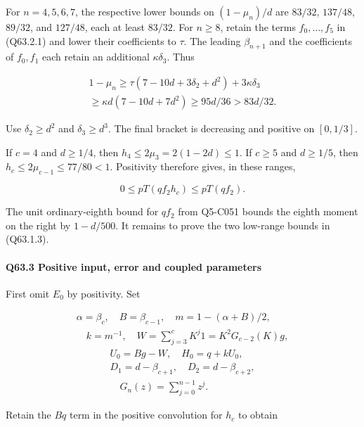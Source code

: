 For $n=\allowbreak 4,\allowbreak  5,\allowbreak  6,\allowbreak  7$, the respective lower bounds on $(1-\mu_n)/d$ are
$83/32$, $137/48$, $89/32$, and $127/48$, each at least $83/32$.
For $n\ge\allowbreak 8$, retain the terms $f_0,\allowbreak  \ldots,\allowbreak  f_5$ in (Q63.2.1) and lower their coefficients to $\tau$.
The leading $\beta_{n+1}$ and the coefficients of $f_0,\allowbreak  f_1$ each retain an additional $\kappa \delta_3$. Thus

\[
\begin{gathered}
1-\mu_n\ge\tau(7-10d+3\delta_2+d^2)+3\kappa \delta_3\\
\ge\kappa d(7-10d+7d^2)\ge95d/36>83d/32.
\end{gathered}
\]

Use $\delta_2\ge\allowbreak  d^2$ and $\delta_3\ge\allowbreak  d^3$. The final bracket is decreasing and positive on $[0,\allowbreak  1/3]$.

If $c=\allowbreak 4$ and $d\ge\allowbreak 1/4$, then $h_4\le\allowbreak 2\mu_3=\allowbreak 2(1-2d)\le\allowbreak 1$.
If $c\ge\allowbreak 5$ and $d\ge\allowbreak 1/5$, then $h_c\le\allowbreak 2\mu_{c-1}\le\allowbreak 77/80<\allowbreak 1$.
Positivity therefore gives, in these ranges,

\[
0\le pT(qf_2h_c)\le pT(qf_2).
\tag{Q63.2.3}\label{eq:Q63:Q63:2:3}
\]

The unit ordinary-eighth bound for $qf_2$ from Q5-C051 bounds the eighth moment on the right by $1-d/500$.
It remains to prove the two low-range bounds in (Q63.1.3).

\paragraph{Q63.3 Positive input, error and coupled parameters}

First omit $E_0$ by positivity. Set

\[
\begin{gathered}
\alpha=\beta_c,\quad B=\beta_{c-1},\quad m=1-(\alpha+B)/2,\\
\quad k=m^{-1},\quad W=\sum_{j=3}^cK^j1=K^2G_{c-2}(K)g,
\end{gathered}
\]
\[
\begin{gathered}
U_0=Bg-W,\quad H_0=q+kU_0,\quad\\
D_1=d-\beta_{c+1},\quad D_2=d-\beta_{c+2},\\
\quad G_n(z)=\sum_{j=0}^{n-1}z^j.
\end{gathered}
\]

Retain the $Bq$ term in the positive convolution for $h_c$ to obtain

